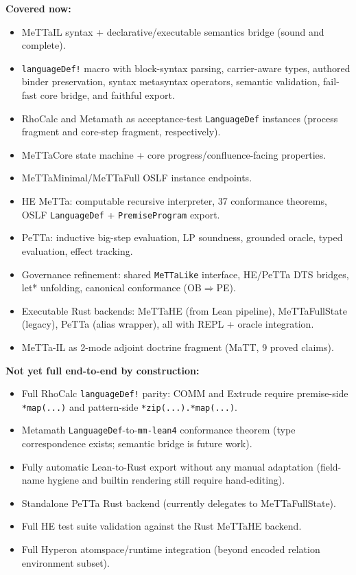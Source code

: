 \documentclass[11pt]{article}
\newcommand{\code}[1]{\texttt{#1}}
\begin{document}
\textbf{Covered now:}
\begin{itemize}
\item MeTTaIL syntax + declarative/executable semantics bridge (sound and complete).
\item \code{languageDef!} macro with block-syntax parsing, carrier-aware types,
  authored binder preservation, syntax metasyntax operators, semantic validation,
  fail-fast core bridge, and faithful export.
\item RhoCalc and Metamath as acceptance-test \code{LanguageDef} instances
  (process fragment and core-step fragment, respectively).
\item MeTTaCore state machine + core progress/confluence-facing properties.
\item MeTTaMinimal/MeTTaFull OSLF instance endpoints.
\item HE MeTTa: computable recursive interpreter, 37 conformance theorems,
  OSLF \code{LanguageDef} + \code{PremiseProgram} export.
\item PeTTa: inductive big-step evaluation, LP soundness, grounded oracle,
  typed evaluation, effect tracking.
\item Governance refinement: shared \code{MeTTaLike} interface, HE/PeTTa
  DTS bridges, let* unfolding, canonical conformance (OB$\Rightarrow$PE).
\item Executable Rust backends: MeTTaHE (from Lean pipeline), MeTTaFullState
  (legacy), PeTTa (alias wrapper), all with REPL + oracle integration.
\item MeTTa-IL as 2-mode adjoint doctrine fragment (MaTT, 9 proved claims).
\end{itemize}

\textbf{Not yet full end-to-end by construction:}
\begin{itemize}
\item Full RhoCalc \code{languageDef!} parity: COMM and Extrude require
  premise-side \code{*map(...)} and pattern-side \code{*zip(...).*map(...)}.
\item Metamath \code{LanguageDef}-to-\code{mm-lean4} conformance theorem
  (type correspondence exists; semantic bridge is future work).
\item Fully automatic Lean-to-Rust export without any manual adaptation
  (field-name hygiene and builtin rendering still require hand-editing).
\item Standalone PeTTa Rust backend (currently delegates to MeTTaFullState).
\item Full HE test suite validation against the Rust MeTTaHE backend.
\item Full Hyperon atomspace/runtime integration (beyond encoded relation
  environment subset).
\end{itemize}
\end{document}
